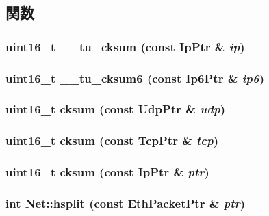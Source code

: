 \subsection{関数}
\hypertarget{namespaceNet_aa160b2c868a18f1793e719a750f41891}{
\subsubsection[{\_\-\_\-tu\_\-cksum}]{\setlength{\rightskip}{0pt plus 5cm}uint16\_\-t \_\-\_\-tu\_\-cksum (const IpPtr \& {\em ip})}}
\label{namespaceNet_aa160b2c868a18f1793e719a750f41891}
\hypertarget{namespaceNet_ac143008a44a1456ad6b820780ca5980e}{
\subsubsection[{\_\-\_\-tu\_\-cksum6}]{\setlength{\rightskip}{0pt plus 5cm}uint16\_\-t \_\-\_\-tu\_\-cksum6 (const Ip6Ptr \& {\em ip6})}}
\label{namespaceNet_ac143008a44a1456ad6b820780ca5980e}
\hypertarget{namespaceNet_a28dfbc35e8046118e0f49a89a57a717a}{
\subsubsection[{cksum}]{\setlength{\rightskip}{0pt plus 5cm}uint16\_\-t cksum (const UdpPtr \& {\em udp})}}
\label{namespaceNet_a28dfbc35e8046118e0f49a89a57a717a}
\hypertarget{namespaceNet_a6ccfd763e7871d9d574f28105e9d9741}{
\subsubsection[{cksum}]{\setlength{\rightskip}{0pt plus 5cm}uint16\_\-t cksum (const TcpPtr \& {\em tcp})}}
\label{namespaceNet_a6ccfd763e7871d9d574f28105e9d9741}
\hypertarget{namespaceNet_a7c7758a7af16c9b808dcb8ddf7aa1a34}{
\subsubsection[{cksum}]{\setlength{\rightskip}{0pt plus 5cm}uint16\_\-t cksum (const IpPtr \& {\em ptr})}}
\label{namespaceNet_a7c7758a7af16c9b808dcb8ddf7aa1a34}
\hypertarget{namespaceNet_a7e50a230aeed27f50f5dd05a5768c74c}{
\subsubsection[{hsplit}]{\setlength{\rightskip}{0pt plus 5cm}int Net::hsplit (const {\bf EthPacketPtr} \& {\em ptr})}}

